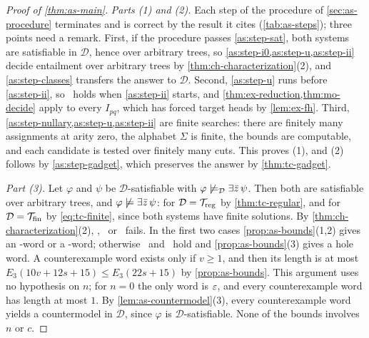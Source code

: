 \begin{proof}[Proof of \cref{thm:as-main}]
\emph{Parts (1) and (2).} Each step of the procedure of
\cref{sec:as-procedure} terminates and is correct by the result it cites
(\cref{tab:as-steps}); three points need a remark. First, if the procedure
passes \cref{as:step-sat}, both systems are satisfiable in $\mathcal D$, hence
over arbitrary trees, so \cref{as:step-i0,as:step-u,as:step-ii} decide
entailment over arbitrary trees by \cref{thm:ch-characterization}(2), and
\cref{as:step-classes} transfers the answer to $\mathcal D$. Second,
\cref{as:step-u} runs before \cref{as:step-ii}, so \CondU\ holds when
\cref{as:step-ii} starts, and \cref{thm:ex-reduction,thm:mo-decide} apply to
every $I_{pq}$, which has forced target heads by \cref{lem:ex-fh}. Third,
\cref{as:step-nullary,as:step-u,as:step-ii} are finite searches: there are
finitely many assignments at arity zero, the alphabet $\Sigma$ is finite, the
bounds are computable, and each candidate is tested over finitely many cuts.
This proves (1), and (2) follows by \cref{as:step-gadget}, which preserves the
answer by \cref{thm:tc-gadget}.

\emph{Part (3).} Let $\varphi$ and $\psi$ be $\mathcal D$-satisfiable with
$\varphi\not\models_{\mathcal D}\exists\bar z\,\psi$. Then both are satisfiable over
arbitrary trees, and $\varphi\not\models\exists\bar z\,\psi$: for
$\mathcal D=\mathcal{T}_{\mathrm{reg}}$ by \cref{thm:tc-regular}, and for
$\mathcal D=\mathcal{T}_{\mathrm{fin}}$ by \cref{eq:tc-finite}, since both systems
have finite solutions. By \cref{thm:ch-characterization}(2), \CondI, \CondU\
or \CondII\ fails. In the first two cases \cref{prop:as-bounds}(1,2) gives an
\CondI-word or a \CondU-word; otherwise \CondI\ and \CondU\ hold and
\cref{prop:as-bounds}(3) gives a hole word. A counterexample word exists only
if $v\ge1$, and then its length is at most
$E_3(10v+12s+15)\le E_3(22s+15)$ by \cref{prop:as-bounds}. This argument uses
no hypothesis on $n$; for $n=0$ the only word is $\varepsilon$, and every
counterexample word has length at most $1$. By
\cref{lem:as-countermodel}(3), every counterexample word yields a
countermodel in $\mathcal D$, since $\varphi$ is $\mathcal D$-satisfiable.
None of the bounds involves $n$ or $c$.


\end{proof}
